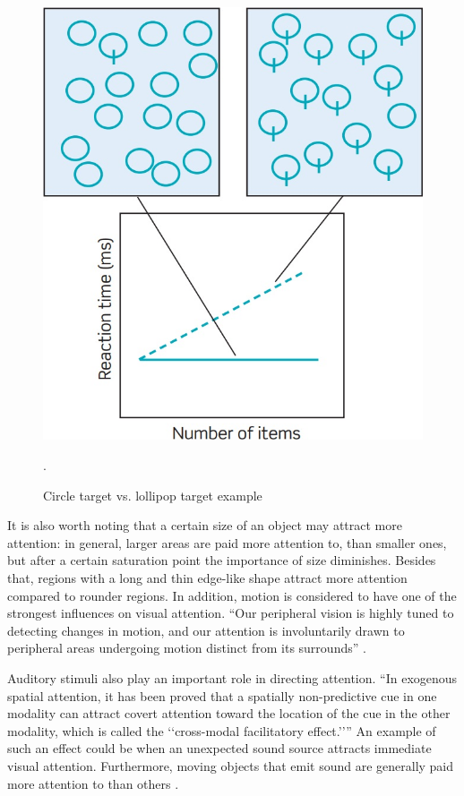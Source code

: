 \begin{figure}[h!]
	\centering
	\includegraphics[width=\textwidth]{figures/circle_lollipop_example.jpg}
	\caption{Circle target vs. lollipop target example \cite{snowden2012basic}}.\label{fig:circle_lollipop_example}
\end{figure}

It is also worth noting that a certain size of an object may attract more attention: in general, larger areas are paid more attention to, than smaller ones, but after a certain saturation point the importance of size diminishes. Besides that, regions with a long and thin edge-like shape attract more attention compared to rounder regions. In addition, motion is considered to have one of the strongest influences on visual attention. “Our peripheral vision is highly tuned to detecting changes in motion, and our attention is involuntarily drawn to peripheral areas undergoing motion distinct from its surrounds” \cite{osberger1998automatic}. 


Auditory stimuli also play an important role in directing attention. “In exogenous spatial attention, it has been proved that a spatially non-predictive cue in one modality can attract covert attention toward the location of the cue in the other modality, which is called the ‘‘cross-modal facilitatory effect.’’” An example of such an effect could be when an unexpected sound source attracts immediate visual attention. Furthermore, moving objects that emit sound are generally paid more attention to than others \cite{lee2011efficient}.


